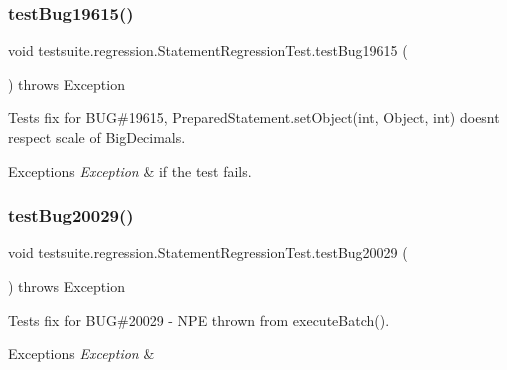 \subsubsection{\texorpdfstring{test\+Bug19615()}{testBug19615()}}
{\footnotesize\ttfamily void testsuite.\+regression.\+Statement\+Regression\+Test.\+test\+Bug19615 (\begin{DoxyParamCaption}{ }\end{DoxyParamCaption}) throws Exception}

Tests fix for B\+UG\#19615, Prepared\+Statement.\+set\+Object(int, Object, int) doesn\textquotesingle{}t respect scale of Big\+Decimals.


\begin{DoxyExceptions}{Exceptions}
{\em Exception} & if the test fails. \\
\hline
\end{DoxyExceptions}
\mbox{\label{classtestsuite_1_1regression_1_1_statement_regression_test_abe26694e3066526cd5be755352de286b}} 
\subsubsection{\texorpdfstring{test\+Bug20029()}{testBug20029()}}
{\footnotesize\ttfamily void testsuite.\+regression.\+Statement\+Regression\+Test.\+test\+Bug20029 (\begin{DoxyParamCaption}{ }\end{DoxyParamCaption}) throws Exception}

Tests fix for B\+UG\#20029 -\/ N\+PE thrown from execute\+Batch().


\begin{DoxyExceptions}{Exceptions}
{\em Exception} & \\
\hline
\end{DoxyExceptions}
\mbox{\label{classtestsuite_1_1regression_1_1_statement_regression_test_ac72c67849f782594f7036b96b6053eed}} 
